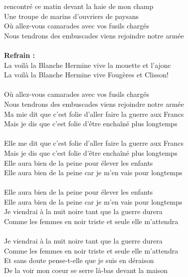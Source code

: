
 rencontré ce matin devant la haie de mon champ
\\Une troupe de marins d'ouvriers de paysans
\\Où allez-vous camarades avec vos fusils chargés
\\Nous tendrons des embuscades viens rejoindre notre armée
\\\\\textbf{Refrain :}
\\La voilà la Blanche Hermine vive la mouette et l'ajonc
\\La voilà la Blanche Hermine vive Fougères et Clisson!
\\\\Où allez-vous camarades avec vos fusils chargés
\\Nous tendrons des embuscades viens rejoindre notre armée
\\Ma mie dit que c'est folie d'aller faire la guerre aux Francs
\\Mais je dis que c'est folie d'être enchaîné plus longtemps
\\\\Elle me dit que c'est folie d'aller faire la guerre aux Francs
\\Mais je dis que c'est folie d'être enchaîné plus longtemps
\\Elle aura bien de la peine pour élever les enfants
\\Elle aura bien de la peine car je m'en vais pour longtemps
\\\\Elle aura bien de la peine pour élever les enfants
\\Elle aura bien de la peine car je m'en vais pour longtemps
\\Je viendrai à la nuit noire tant que la guerre durera
\\Comme les femmes en noir triste et seule elle m'attendra
\\\\Je viendrai à la nuit noire tant que la guerre durera
\\Comme les femmes en noir triste et seule elle m'attendra
\\Et sans doute pense-t-elle que je suis en déraison
\\De la voir mon coeur se serre là-bas devant la maison
